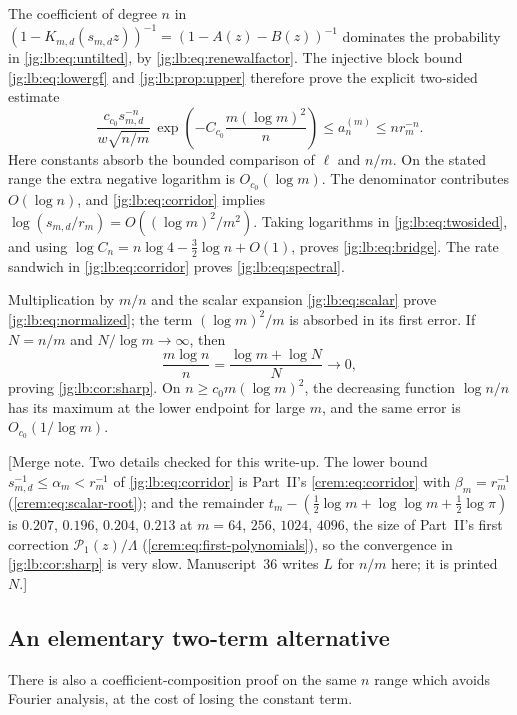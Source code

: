 \documentclass[11pt,a4paper]{article}
\theoremstyle{definition}\newaliascnt{definition}{theorem}
\theoremstyle{remark}\newaliascnt{remark}{theorem}
\begin{document}
The coefficient of degree $n$ in
$(1-K_{m,d}(s_{m,d}z))^{-1}=(1-A(z)-B(z))^{-1}$ dominates the probability in
\eqref{jg:lb:eq:untilted}, by \eqref{jg:lb:eq:renewalfactor}. The injective
block bound \eqref{jg:lb:eq:lowergf} and \cref{jg:lb:prop:upper} therefore prove
the explicit two-sided estimate
\begin{equation}\label{jg:lb:eq:twosided}
 \frac{c_{c_0}s_{m,d}^{-n}}{w\sqrt{n/m}}\,
       \exp\!\left(-C_{c_0}\frac{m(\log m)^2}{n}\right)
 \le a_n^{(m)}\le n r_m^{-n}.
\end{equation}
Here constants absorb the bounded comparison of $\ell$ and $n/m$. On the stated
range the extra negative logarithm is $O_{c_0}(\log m)$. The denominator
contributes $O(\log n)$, and \eqref{jg:lb:eq:corridor} implies
$\log(s_{m,d}/r_m)=O((\log m)^2/m^2)$. Taking logarithms in
\eqref{jg:lb:eq:twosided}, and using $\log C_n=n\log4-\tfrac32\log n+O(1)$,
proves \eqref{jg:lb:eq:bridge}. The rate sandwich in \eqref{jg:lb:eq:corridor}
proves \eqref{jg:lb:eq:spectral}.

Multiplication by $m/n$ and the scalar expansion \eqref{jg:lb:eq:scalar} prove
\eqref{jg:lb:eq:normalized}; the term $(\log m)^2/m$ is absorbed in its first
error. If $N=n/m$ and $N/\log m\to\infty$, then
\[
 \frac{m\log n}{n}=\frac{\log m+\log N}{N}\longrightarrow0,
\]
proving \cref{jg:lb:cor:sharp}. On $n\ge c_0m(\log m)^2$, the decreasing
function $\log n/n$ has its maximum at the lower endpoint for large $m$, and the
same error is $O_{c_0}(1/\log m)$.

[Merge note. Two details checked for this write-up. The lower bound
$s_{m,d}^{-1}\le\alpha_m<r_m^{-1}$ of \eqref{jg:lb:eq:corridor} is Part~II's
\eqref{crem:eq:corridor} with $\beta_m=r_m^{-1}$ (\eqref{crem:eq:scalar-root});
and the remainder
$t_m-(\frac12\log m+\log\log m+\frac12\log\pi)$ is $0.207$, $0.196$, $0.204$,
$0.213$ at $m=64$, $256$, $1024$, $4096$, the size of Part~II's first
correction $\mathcal P_1(z)/\Lambda$ (\eqref{crem:eq:first-polynomials}), so
the convergence in \cref{jg:lb:cor:sharp} is very slow. Manuscript~36 writes
$L$ for $n/m$ here; it is printed $N$.]

\subsection{An elementary two-term alternative}
\label{jg:sec:bridge-elementary}
There is also a coefficient-composition proof on the same $n$ range which
avoids Fourier analysis, at the cost of losing the constant term.
\end{document}
